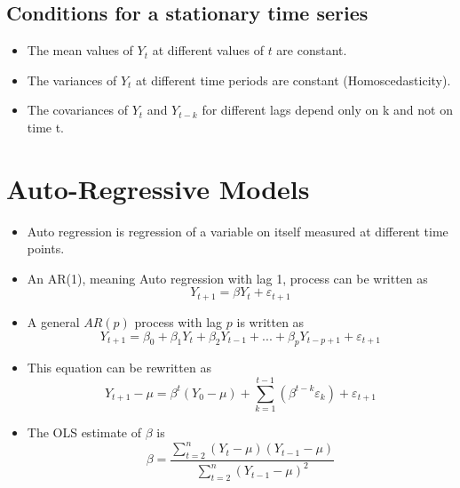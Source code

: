 \documentclass{article}
\theoremstyle{plain}
\theoremstyle{definition}
\begin{document}
\subsection{Conditions for a stationary time series}
\begin{itemize}
    \item The mean values of $Y_t$ at different values of $t$ are constant.
    \item The variances of $Y_t$ at different time periods are constant (Homoscedasticity).
    \item The covariances of $Y_t$ and $Y_{t-k}$ for different lags depend only on k and not on time t.
\end{itemize}

\section{Auto-Regressive Models}
\begin{itemize}
    \item Auto regression is regression of a variable on itself measured at different time points.
    
    \item An AR(1), meaning Auto regression with lag 1, process can be written as
    \begin{equation}
        Y_{t+1} = \beta Y_t + \varepsilon_{t+1}
    \end{equation}
    
    \item A general $AR(p)$ process with lag $p$ is written as
    \begin{equation}
        Y_{t+1} = \beta_0 + \beta_1 Y_{t} + \beta_2 Y_{t-1} + ... + \beta_p Y_{t-p+1} + \varepsilon_{t+1}
    \end{equation}
    
    \item This equation can be rewritten as
    \begin{equation}
        Y_{t+1} - \mu = \beta^t (Y_0 - \mu) + \sum_{k=1}^{t-1} (\beta^{t-k} \varepsilon_k) + \varepsilon_{t+1}
    \end{equation}
    
    \item The OLS estimate of $\beta$ is
    \begin{equation*}
        \beta = \frac{\sum\limits_{t=2}^{n} (Y_t - \mu)(Y_{t-1}-\mu)}{\sum\limits_{t=2}^{n}(Y_{t-1}-\mu)^2}
    \end{equation*}
\end{itemize}
\end{document}
